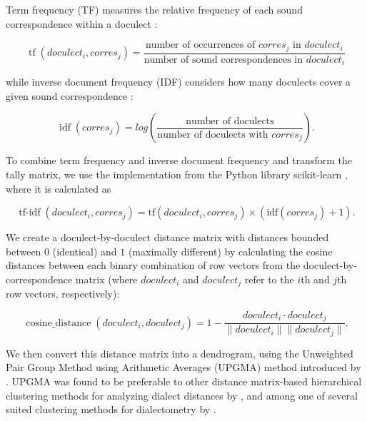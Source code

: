 \documentclass[a4paper]{article}
\begin{document}
Term frequency (TF) measures the relative frequency
of each sound correspondence within a doculect \citep{luhn1957statistical}:

\begin{equation*}
\operatorname{tf}(doculect_i, corres_j) =
\frac{\text{number of occurrences of } corres_j \text{ in } doculect_i}
{\text{number of sound correspondences in } doculect_i}
\end{equation*}

while inverse document frequency (IDF)
considers how many doculects cover a given
sound correspondence \citep{spaerck1972statistical}:

\begin{equation*}
\operatorname{idf}(corres_j) =
log(
\frac{\text{number of doculects}}
{\text{number of doculects with } corres_j}
).
\end{equation*}

To combine term frequency and inverse document frequency
and transform the tally matrix, 
we use the implementation from the Python library scikit-learn
\citep{pedregosa2011scikit-learn},
where it is calculated as

\begin{equation*}
\operatorname{tf-idf}(doculect_i, corres_j) =
\text{tf}(doculect_i, corres_j)
\times
(
\text{idf}(corres_j)
+ 1).
\end{equation*}

We create a doculect-by-doculect distance matrix
with distances bounded between $0$ (identical) and $1$ (maximally different)
by calculating the cosine distances between each
binary combination of row vectors from the doculect-by-correspondence matrix
(where $doculect_i$ and $doculect_j$ refer to the $i$th and $j$th row vectors, respectively):

\begin{equation*}
\operatorname{cosine\_distance}(doculect_i,doculect_j) =
1 -
\frac{doculect_i \cdot doculect_j}{\lVert doculect_i \rVert \lVert doculect_j \rVert}
.
\end{equation*}

We then convert this distance matrix into a dendrogram,
using the
Unweighted Pair Group Method using Arithmetic Averages
(UPGMA) method introduced by \citet{sokal1958statistical}.
UPGMA was found to be preferable to other
distance matrix-based hierarchical clustering methods
for analyzing dialect distances by \citet{heeringa2004measuring},
and among one of several suited clustering methods for dialectometry
by \citet{prokic2008recognizing}.
\end{document}
